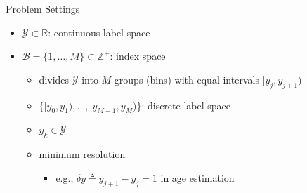 \begin{frame}{Problem Settings}
	\begin{itemize}\setlength\itemsep{2em}
		\item<1-> $\mathcal{Y}\subset\mathbb{R}$: continuous label space
		\item<2-> $\mathcal{B} = \{1,\dots,M\}\subset\mathbb{Z}^+$: index space
		\begin{itemize}\setlength\itemsep{1em}
			\item divides $\mathcal{Y}$ into $M$ groups (bins) with equal intervals $[y_j, y_{j+1})$
			\item $\{[y_0, y_1), \dots, [y_{M-1}, y_M)\}$: discrete label space
			\item $y_k\in\mathcal{Y}$
			\item minimum resolution
			\begin{itemize}
				\item e.g., $\delta y \triangleq y_{j+1} - y_j = 1$ in age estimation
			\end{itemize}	
		\end{itemize}
	\end{itemize}
\end{frame}
